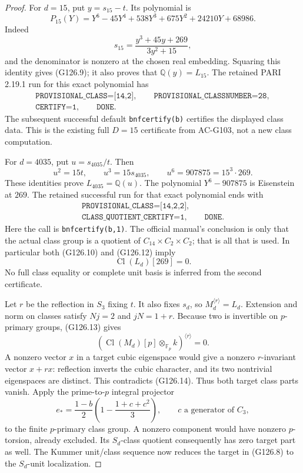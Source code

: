 \begin{proof}
For \(d=15\), put \(y=s_{15}-t\).  Its polynomial is
\[
 P_{15}(Y)=Y^6-45Y^4+538Y^3+675Y^2+24210Y+68986.
 \tag{G126.9}
\]
Indeed
\[
 s_{15}=\frac{y^3+45y+269}{3y^2+15},
\]
and the denominator is nonzero at the chosen real embedding.
Squaring this identity gives (G126.9); it also proves that
\(\mathbb Q(y)=L_{15}\).
The retained PARI 2.19.1 run for this exact polynomial has
\[
 \begin{gathered}
  \texttt{PROVISIONAL\_CLASS=[14,2]},\qquad
  \texttt{PROVISIONAL\_CLASSNUMBER=28},\\
  \texttt{CERTIFY=1},\qquad \texttt{DONE}.
 \end{gathered}
 \tag{G126.10}
\]
The subsequent successful default
\texttt{bnfcertify(b)} certifies the displayed class data.
This is the existing
full \(D=15\) certificate from AC-G103, not a new class computation.

For \(d=4035\), put \(u=s_{4035}/t\).  Then
\[
 u^2=15t,\qquad u^3=15s_{4035},\qquad u^6=907875=15^3\cdot269.
 \tag{G126.11}
\]
These identities prove \(L_{4035}=\mathbb Q(u)\).
The polynomial \(Y^6-907875\) is Eisenstein at \(269\).
The retained successful run for that exact polynomial ends with
\[
 \begin{gathered}
 \texttt{PROVISIONAL\_CLASS=[14,2,2]},\\
 \texttt{CLASS\_QUOTIENT\_CERTIFY=1},\qquad \texttt{DONE}.
 \end{gathered}
 \tag{G126.12}
\]
Here the call is \texttt{bnfcertify(b,1)}.  The official manual's
conclusion is only that the actual class group is a quotient
of \(C_{14}\times C_2\times C_2\); that is all that is used.
In particular both (G126.10) and (G126.12) imply
\[
                         \operatorname{Cl}(L_d)[269]=0.
 \tag{G126.13}
\]
No full class equality or complete unit basis is inferred
from the second certificate.

Let \(r\) be the reflection in \(S_3\) fixing \(t\).
It also fixes \(s_d\), so \(M_d^{\langle r\rangle}=L_d\).
Extension and norm on classes satisfy \(Nj=2\) and
\(jN=1+r\).  Because two is invertible on \(p\)-primary
groups, (G126.13) gives
\[
        (\operatorname{Cl}(M_d)[p]\otimes_{\mathbb F_p}k)
                         ^{\langle r\rangle}=0.
 \tag{G126.14}
\]
A nonzero vector \(x\) in a target cubic eigenspace would
give a nonzero \(r\)-invariant vector \(x+rx\): reflection
inverts the cubic character, and its two nontrivial
eigenspaces are distinct.  This contradicts (G126.14).
Thus both target class parts vanish.
Apply the prime-to-\(p\) integral projector
\[
       e_*=\frac{1-b}{2}\left(1-\frac{1+c+c^2}{3}\right),
       \qquad c\text{ a generator of }C_3,
 \tag{G126.15}
\]
to the finite \(p\)-primary class group.  A nonzero component
would have nonzero \(p\)-torsion, already excluded.
Its \(S_d\)-class quotient consequently has zero target
part as well.  The Kummer unit/class sequence now reduces
the target in (G126.8) to the \(S_d\)-unit localization.


\end{proof}
